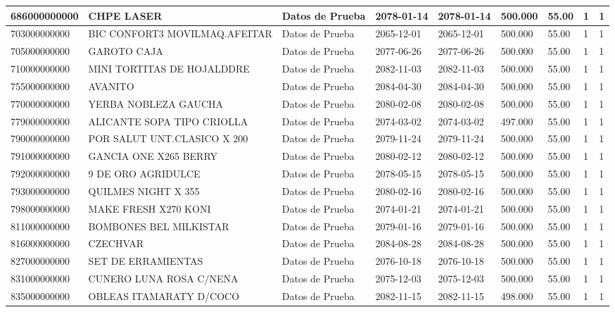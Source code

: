 \documentclass[a4paper,12pt]{article}
\begin{document}
\begin{landscape}
\begin{longtable}{|p{4cm}|p{2.5cm}|p{2.5cm}|p{1.8cm}|p{1.8cm}|p{1cm}|p{1cm}|p{3cm}|p{3cm}||}
686000000000 & CHPE LASER & Datos de Prueba & 2078-01-14 & 2078-01-14 & 500.000 & 55.00 & 1 & 1 \\ \hline 
703000000000 & BIC CONFORT3 MOVILMAQ.AFEITAR & Datos de Prueba & 2065-12-01 & 2065-12-01 & 500.000 & 55.00 & 1 & 1 \\ \hline 
705000000000 & GAROTO CAJA & Datos de Prueba & 2077-06-26 & 2077-06-26 & 500.000 & 55.00 & 1 & 1 \\ \hline 
710000000000 & MINI TORTITAS DE HOJALDDRE & Datos de Prueba & 2082-11-03 & 2082-11-03 & 500.000 & 55.00 & 1 & 1 \\ \hline 
755000000000 & AVANITO & Datos de Prueba & 2084-04-30 & 2084-04-30 & 500.000 & 55.00 & 1 & 1 \\ \hline 
770000000000 & YERBA NOBLEZA GAUCHA & Datos de Prueba & 2080-02-08 & 2080-02-08 & 500.000 & 55.00 & 1 & 1 \\ \hline 
779000000000 & ALICANTE SOPA TIPO CRIOLLA & Datos de Prueba & 2074-03-02 & 2074-03-02 & 497.000 & 55.00 & 1 & 1 \\ \hline 
790000000000 & POR SALUT UNT.CLASICO X 200 & Datos de Prueba & 2079-11-24 & 2079-11-24 & 500.000 & 55.00 & 1 & 1 \\ \hline 
791000000000 & GANCIA ONE X265 BERRY & Datos de Prueba & 2080-02-12 & 2080-02-12 & 500.000 & 55.00 & 1 & 1 \\ \hline 
792000000000 & 9 DE ORO AGRIDULCE & Datos de Prueba & 2078-05-15 & 2078-05-15 & 500.000 & 55.00 & 1 & 1 \\ \hline 
793000000000 & QUILMES NIGHT X 355 & Datos de Prueba & 2080-02-16 & 2080-02-16 & 500.000 & 55.00 & 1 & 1 \\ \hline 
798000000000 & MAKE FRESH X270 KONI & Datos de Prueba & 2074-01-21 & 2074-01-21 & 500.000 & 55.00 & 1 & 1 \\ \hline 
811000000000 & BOMBONES BEL MILKISTAR & Datos de Prueba & 2079-01-16 & 2079-01-16 & 500.000 & 55.00 & 1 & 1 \\ \hline 
816000000000 & CZECHVAR & Datos de Prueba & 2084-08-28 & 2084-08-28 & 500.000 & 55.00 & 1 & 1 \\ \hline 
827000000000 & SET DE ERRAMIENTAS & Datos de Prueba & 2076-10-18 & 2076-10-18 & 500.000 & 55.00 & 1 & 1 \\ \hline 
831000000000 & CUNERO LUNA ROSA C/NENA & Datos de Prueba & 2075-12-03 & 2075-12-03 & 500.000 & 55.00 & 1 & 1 \\ \hline 
835000000000 & OBLEAS ITAMARATY D/COCO & Datos de Prueba & 2082-11-15 & 2082-11-15 & 498.000 & 55.00 & 1 & 1 \\ \hline 

\end{longtable}
\end{landscape}
\end{document}
